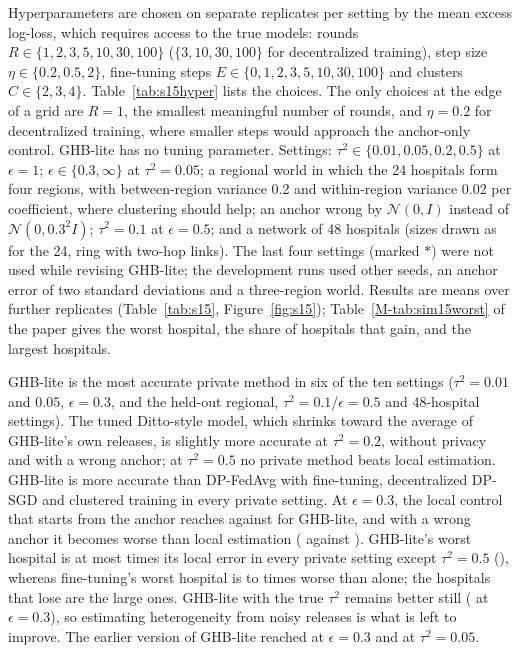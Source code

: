 \documentclass[acmsmall,screen,nonacm]{acmart}
\theoremstyle{acmdefinition}
\begin{document}
Hyperparameters are chosen on \SimFifteenTune{} separate replicates per setting by the mean excess log-loss, which requires access to the true models: rounds $R\in\{1,2,3,5,10,30,100\}$ ($\{3,10,30,100\}$ for decentralized training), step size $\eta\in\{0.2,0.5,2\}$, fine-tuning steps $E\in\{0,1,2,3,5,10,30,100\}$ and clusters $C\in\{2,3,4\}$. Table~\ref{tab:s15hyper} lists the choices. The only choices at the edge of a grid are $R=1$, the smallest meaningful number of rounds, and $\eta=0.2$ for decentralized training, where smaller steps would approach the anchor-only control. GHB-lite has no tuning parameter. Settings: $\tau^2\in\{0.01,0.05,0.2,0.5\}$ at $\epsilon=1$; $\epsilon\in\{0.3,\infty\}$ at $\tau^2=0.05$; a regional world in which the 24 hospitals form four regions, with between-region variance 0.2 and within-region variance 0.02 per coefficient, where clustering should help; an anchor wrong by $\mathcal{N}(0,I)$ instead of $\mathcal{N}(0,0.3^2I)$; $\tau^2=0.1$ at $\epsilon=0.5$; and a network of 48 hospitals (sizes drawn as for the 24, ring with two-hop links). The last four settings (marked $\ast$) were not used while revising GHB-lite; the development runs used other seeds, an anchor error of two standard deviations and a three-region world. Results are means over \SimFifteenReps{} further replicates (Table~\ref{tab:s15}, Figure~\ref{fig:s15}); Table~\ref{M-tab:sim15worst} of the paper gives the worst hospital, the share of hospitals that gain, and the largest hospitals.

GHB-lite is the most accurate private method in six of the ten settings ($\tau^2=0.01$ and $0.05$, $\epsilon=0.3$, and the held-out regional, $\tau^2=0.1$/$\epsilon=0.5$ and 48-hospital settings). The tuned Ditto-style \cite{li2021ditto} model, which shrinks toward the average of GHB-lite's own releases, is slightly more accurate at $\tau^2=0.2$, without privacy and with a wrong anchor; at $\tau^2=0.5$ no private method beats local estimation. GHB-lite is more accurate than DP-FedAvg \cite{mcmahan2018learning} with fine-tuning, decentralized DP-SGD \cite{lian2017can} and clustered training in every private setting. At $\epsilon=0.3$, the local control that starts from the anchor reaches \SimFifteenStrictAnchorGD{} against \SimFifteenStrictGHB{} for GHB-lite, and with a wrong anchor it becomes worse than local estimation (\SimFifteenAnchorAnchorGD{} against \SimFifteenAnchorLocal). GHB-lite's worst hospital is at most \SimFifteenGHBWorstMax{} times its local error in every private setting except $\tau^2=0.5$ (\SimFifteenExtremeGHBWorst), whereas fine-tuning's worst hospital is \SimFifteenFTWorstMin{} to \SimFifteenFTWorstMax{} times worse than alone; the hospitals that lose are the large ones. GHB-lite with the true $\tau^2$ remains better still (\SimFifteenStrictOracle{} at $\epsilon=0.3$), so estimating heterogeneity from noisy releases is what is left to improve. The earlier version of GHB-lite reached \SimFifteenStrictOld{} at $\epsilon=0.3$ and \SimFifteenMidOld{} at $\tau^2=0.05$.
\end{document}
